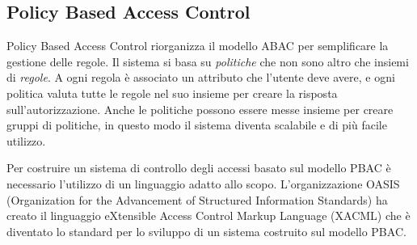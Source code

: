 \subsection{Policy Based Access Control}
\label{sub:PBAC}
Policy Based Access Control riorganizza il modello ABAC per semplificare la gestione delle regole.
Il sistema si basa su \emph{politiche} che non sono altro che insiemi di \emph{regole}. A ogni regola è associato un attributo
che l'utente deve avere, e ogni politica valuta tutte le regole nel suo insieme per creare la risposta sull'autorizzazione. Anche
le politiche possono essere messe insieme per creare gruppi di politiche, in questo modo il sistema diventa scalabile e di
più facile utilizzo.\par
Per costruire un sistema di controllo degli accessi basato sul modello PBAC è necessario l'utilizzo di
un linguaggio adatto allo scopo. L'organizzazione OASIS (Organization for the Advancement of
 Structured Information Standards) ha creato il linguaggio eXtensible Access
Control Markup Language (XACML) che è diventato lo standard per lo sviluppo di un sistema costruito sul modello PBAC.
